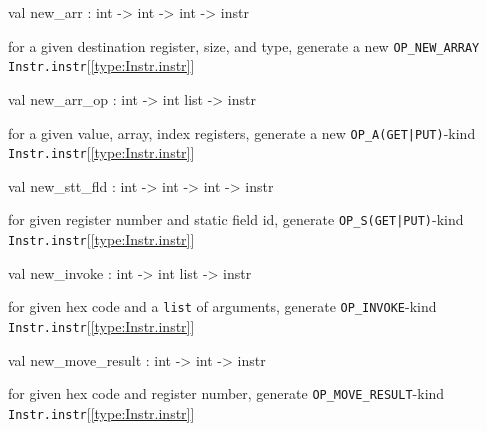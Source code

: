 \documentclass[11pt]{article}
\begin{document}
\label{val:Instr.new-underscorearr}\begin{ocamldoccode}
val new_arr : int -> int -> int -> instr
\end{ocamldoccode}
\begin{ocamldocdescription}
for a given destination register, size, and type,
 generate a new {\tt{OP\_NEW\_ARRAY}} {\tt{Instr.instr}}[\ref{type:Instr.instr}]


\end{ocamldocdescription}




\label{val:Instr.new-underscorearr-underscoreop}\begin{ocamldoccode}
val new_arr_op : int -> int list -> instr
\end{ocamldoccode}
\begin{ocamldocdescription}
for a given value, array, index registers,
 generate a new {\tt{OP\_A(GET|PUT)}}-kind {\tt{Instr.instr}}[\ref{type:Instr.instr}]


\end{ocamldocdescription}




\label{val:Instr.new-underscorestt-underscorefld}\begin{ocamldoccode}
val new_stt_fld : int -> int -> int -> instr
\end{ocamldoccode}
\begin{ocamldocdescription}
for given register number and static field id,
 generate {\tt{OP\_S(GET|PUT)}}-kind {\tt{Instr.instr}}[\ref{type:Instr.instr}]


\end{ocamldocdescription}




\label{val:Instr.new-underscoreinvoke}\begin{ocamldoccode}
val new_invoke : int -> int list -> instr
\end{ocamldoccode}
\begin{ocamldocdescription}
for given hex code and a {\tt{list}} of arguments,
 generate {\tt{OP\_INVOKE}}-kind {\tt{Instr.instr}}[\ref{type:Instr.instr}]


\end{ocamldocdescription}




\label{val:Instr.new-underscoremove-underscoreresult}\begin{ocamldoccode}
val new_move_result : int -> int -> instr
\end{ocamldoccode}
\begin{ocamldocdescription}
for given hex code and register number,
 generate {\tt{OP\_MOVE\_RESULT}}-kind {\tt{Instr.instr}}[\ref{type:Instr.instr}]


\end{ocamldocdescription}
\end{document}
